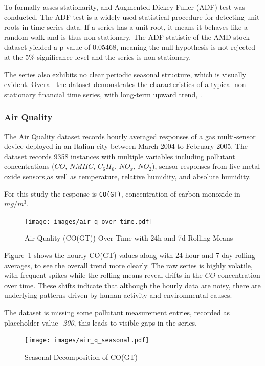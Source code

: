 \documentclass[conference]{IEEEtran}
\begin{document}
To formally asses stationarity, and Augmented Dickey-Fuller (ADF) test was conducted. The ADF test is a widely used statistical procedure for detecting unit roots in time series data. If a series has a unit root, it means it behaves like a random walk and is thus non-stationary. The ADF statistic of the AMD stock dataset yielded a p-value of 0.05468, meaning the null hypothesis is not rejected at the 5\% significance level and the series is non-stationary.

The series also exhibits no clear periodic seasonal structure, which is visually evident. Overall the dataset demonstrates the characteristics of a typical non-stationary financial time series, with long-term upward trend, \cite{stock_market_dataset_amd}.

\subsubsection{\textbf{Air Quality}}

The Air Quality dataset records hourly averaged responses of a gas multi-sensor device deployed in an Italian city between March 2004 to February 2005. The dataset records 9358 instances with multiple variables including pollutant concentrations ($CO$, $NMHC$, $C_6H_6$, $NO_x$, $NO_2$), sensor responses from five metal oxide sensors,as well as temperature, relative humidity, and absolute humidity.

For this study the response is  \texttt{CO(GT)}, concentration of carbon monoxide in $mg/m^3$.

\begin{figure}[H]
\centering
\texttt{[image: images/air\_q\_over\_time.pdf]}
\caption{Air Quality (CO(GT)) Over Time with 24h and 7d Rolling Means}
\label{fig:air_q_over_time}
\end{figure}

Figure~\ref{fig:air_q_over_time} shows the hourly CO(GT) values along with 24-hour and 7-day rolling averages, to see the overall trend more clearly. The raw series is highly volatile, with frequent spikes while the rolling means reveal drifts in the $CO$ concentration over time. These shifts indicate that although the hourly data are noisy, there are underlying patterns driven by human activity and environmental causes.

The dataset is missing some pollutant measurement entries, recorded as placeholder value \textit{-200}, this leads to visible gaps in the series.

\begin{figure}[H]
\centering
\texttt{[image: images/air\_q\_seasonal.pdf]}
\caption{Seasonal Decomposition of CO(GT)}
\label{fig:air_q_seasonal}
\end{figure}
\end{document}
